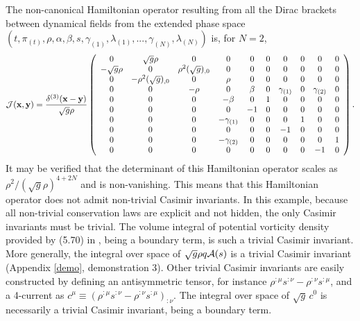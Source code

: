 \documentclass{article}
\numberwithin{equation}{section}
\begin{document}
The non-canonical Hamiltonian operator resulting from all the Dirac brackets between dynamical fields from the extended phase space $(t,\pi_{(t)},\rho,\alpha,\beta,s,\gamma_{(1)},\lambda_{(1)},...,\gamma_{(N)},\lambda_{(N)})$ is, for $N=2$,
\begin{align}
{\cal J}({\mathbf x},{\mathbf y})=\frac{\delta^{(3)}({\mathbf x}-{\mathbf y})}{\sqrt{g}\rho}\left(
\begin{array}{cccccccccc}
 0 & \sqrt{g}\rho & 0 & 0 & 0 & 0 & 0 & 0 & 0 & 0 \\
-\sqrt{g}\rho & 0 & \rho^2 (\sqrt{g})_{,0}  & 0 & 0 & 0 & 0 & 0 & 0 & 0 \\
 0 & -\rho^2 (\sqrt{g})_{,0} & 0 & \rho & 0 & 0 & 0 & 0 & 0 & 0 \\
 0 & 0 & -\rho & 0 & \beta & 0 & \gamma_{(1)} & 0 & \gamma_{(2)} & 0 \\
 0 & 0 & 0 & -\beta & 0 & 1 & 0 & 0 & 0 & 0 \\
 0 & 0 & 0 & 0 & -1 & 0 & 0 & 0 & 0 & 0 \\
 0 & 0 & 0 & -\gamma_{(1)} & 0 & 0 & 0 & 1 & 0 & 0 \\
 0 & 0 & 0 & 0 & 0 & 0 & -1 & 0 & 0 & 0 \\
 0 & 0 & 0 & -\gamma_{(2)} & 0 & 0 & 0 & 0 & 0 & 1 \\
 0 & 0 & 0 & 0 & 0 & 0 & 0 & 0 & -1 & 0
\end{array}
\right).
\end{align}
It may be verified that the determinant of this Hamiltonian operator scales as $\rho^2/(\sqrt{g}\rho)^{4+2N}$ and is non-vanishing. This means that this Hamiltonian operator does not admit non-trivial Casimir invariants. In this example, because all non-trivial conservation laws are explicit and not hidden, the only Casimir invariants must be trivial. The volume integral of potential vorticity density provided by (5.70) in \citet{Charron18b}, being a boundary term, is such a trivial Casimir invariant. More generally, the integral over space of $\sqrt{g}\rho q{\cal A}(s)$ is a trivial Casimir invariant (Appendix \ref{demo}, demonstration 3). Other trivial Casimir invariants are easily constructed by defining an antisymmetric tensor, for instance $\rho^{:\mu}s^{:\nu}-\rho^{:\nu}s^{:\mu}$, and a 4-current as $c^\mu\equiv (\rho^{:\mu}s^{:\nu}-\rho^{:\nu}s^{:\mu})_{:\nu}$. The integral over space of $\sqrt{g}\,c^0$ is necessarily a trivial Casimir invariant, being a boundary term.
\end{document}
